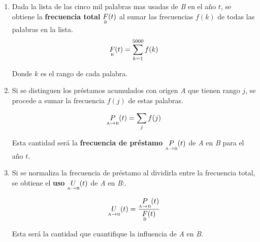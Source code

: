 \begin{enumerate}
	\label{proceso_uso}
	
	\item  Dada la lista de las cinco mil palabras mas usadas de \textit{B} en el año $t$, se obtiene la \textbf{frecuencia total} $\underset{\text{\tiny B}}{F}(t)$ al sumar las frecuencias $f(k)$ de todas las palabras en la lista.
	\begin{equation}
	\label{ec.ftot}
	\underset{\text{\tiny B}}{F}(t) = \sum_{k=1}^{5000} f(k)
	\end{equation}
	 
	 Donde $k$ es el rango  de cada palabra.
	
	\item Si se distinguen los préstamos acumulados con origen \textit{A}  que tienen rango $j$,  se procede a sumar la frecuencia $f(j)$ de estas palabras.
	
	\begin{equation}
	\label{ec.fpres}
	\underset{ \text{\tiny A} \to  \text{\tiny B} }{P}(t) = \sum_{j} f(j)
	\end{equation}
	
	 Esta cantidad será la  \textbf{frecuencia de préstamo} $\underset{ \text{\tiny A} \to  \text{\tiny B} }{P}(t)$   de \textit{A} en \textit{B} para el año $t$.
	
	\item Si se normaliza la frecuencia de préstamo al dividirla entre la frecuencia total, se obtiene el \textbf{uso} $\underset{ \text{\tiny A} \to  \text{\tiny B} }{U}(t)$  de \textit{A} en \textit{B}:. 
	
	\begin{equation}
	\label{ec.fuso}
	\underset{ \text{\tiny A} \to  \text{\tiny B} }{U}(t) = \frac{	\underset{ \text{\tiny A} \to  \text{\tiny B} }{P}(t)}{\underset{\text{\tiny B}}{F}(t) }
	\end{equation}
	
	Esta será la cantidad  que cuantifique la influencia de \textit{A} en \textit{B}.
	
	
	
\end{enumerate}


